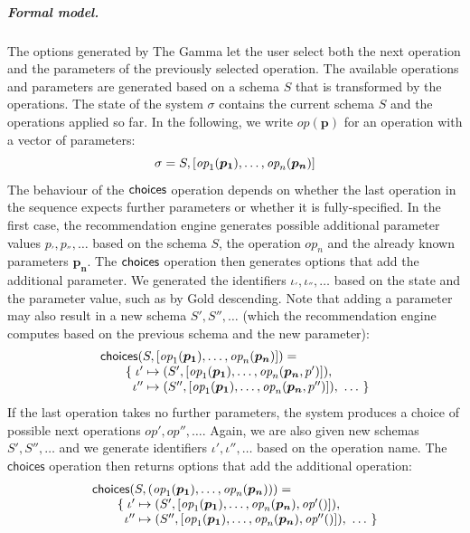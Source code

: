 \documentclass[a4paper,UKenglish,cleveref, autoref, thm-restate]{lipics-v2021}
\newcommand{\ident}[1]{\textsf{#1}}
\newcommand{\ddident}[1]{\guillemotleft\ident{#1}\guillemotright}
\newcommand{\choices}{\textnormal{\ident{choices}}}
\newcommand{\op}{\textit{op}}
\newcommand{\vect}[1]{\lbrack #1 \rbrack}
\begin{document}
\subparagraph{Formal model.}
The options generated by The Gamma let the user select both the next operation and the parameters
of the previously selected operation. The available operations and parameters are generated
based on a schema $S$ that is transformed by the operations. The state of the system $\sigma$
contains the current schema $S$ and the operations applied so far. In the following, we write
$\op(\boldsymbol{p})$ for an operation with a vector of parameters:
\[
\sigma = S, \vect{\op_1(\boldsymbol{p_1}), \ldots, \op_n(\boldsymbol{p_n})}\\
\]
The behaviour of the $\choices$ operation depends on whether the last operation in the sequence
expects further parameters or whether it is fully-specified. In the first case, the recommendation
engine generates possible additional parameter values $p_', p_'', \ldots$ based on the schema $S$,
the operation $\op_n$ and the already known parameters $\boldsymbol{p_n}$.
The $\choices$ operation then generates options that add the additional parameter. We generated the
identifiers $\iota_',\iota_'',\ldots$ based on the state and the parameter value, such as
\ddident{by Gold descending}. Note that adding a parameter may also result in a new schema
$S', S'', \ldots$ (which the recommendation engine computes based on the previous schema and the new parameter):
\[
\begin{array}{l}
\choices(S, \vect{\op_1(\boldsymbol{p_1}), \ldots, \op_n(\boldsymbol{p_n})}) =\\
\qquad \{\; \iota' \mapsto (S', \vect{\op_1(\boldsymbol{p_1}), \ldots, \op_n(\boldsymbol{p_n},p')}), \\
\qquad\;\;    \iota'' \mapsto (S'', \vect{\op_1(\boldsymbol{p_1}), \ldots, \op_n(\boldsymbol{p_n},p'')}), ~\ldots~\}
\end{array}
\]
If the last operation takes no further parameters, the system produces a choice
of possible next operations $\op', \op'', \ldots$. Again, we are also given new schemas $S', S'', \ldots$
and we generate identifiers $\iota',\iota'',\ldots$ based on the operation name. The $\ident{choices}$
operation then returns options that add the additional operation:
\[
\begin{array}{l}
\choices(S, (\op_1(\boldsymbol{p_1}), \ldots, \op_n(\boldsymbol{p_n}))) =\\
\qquad \{\; \iota' \mapsto (S', \vect{\op_1(\boldsymbol{p_1}), \ldots, \op_n(\boldsymbol{p_n}), \op'()}), \\
\qquad \;\; \iota'' \mapsto (S'', \vect{\op_1(\boldsymbol{p_1}), \ldots, \op_n(\boldsymbol{p_n}), \op''()}), ~\ldots~\}
\end{array}
\]
\end{document}
